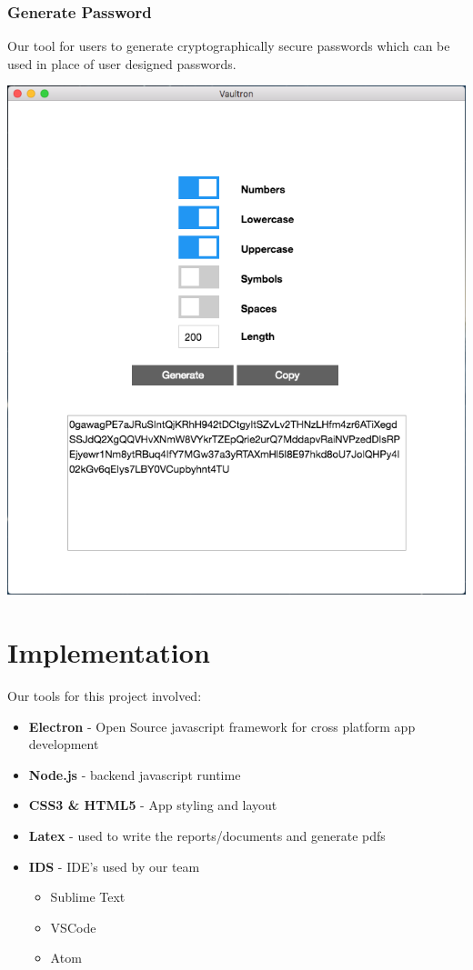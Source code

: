 \documentclass[11pt]{report}
\begin{document}
\subsection{Generate Password}
Our tool for users to generate cryptographically secure passwords which can be
used in place of user designed passwords.
\begin{center}
\includegraphics[scale=0.40]{app-passgen-demo.png}
\end{center}


\chapter{Implementation}
Our tools for this project involved:

\begin{itemize}
    \item \textbf{Electron} - Open Source javascript framework for cross platform app development
    \item \textbf{Node.js} - backend javascript runtime
    \item \textbf{CSS3 & HTML5} - App styling and layout
    \item \textbf{Latex} - used to write the reports/documents and generate pdfs
    \item \textbf{IDS} - IDE's used by our team 
        \begin{itemize}
            \item Sublime Text
            \item VSCode
            \item Atom
        \end{itemize}
\end{itemize}
\end{document}
